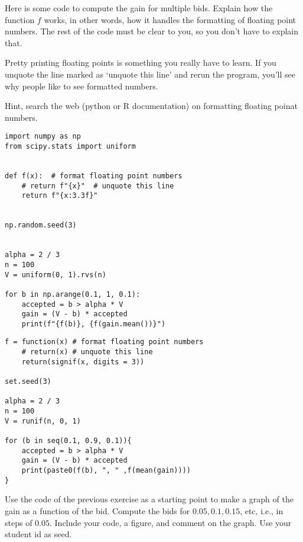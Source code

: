 \begin{exercise}
Here is some code to compute the gain for multiple bids. Explain how the function $f$ works, in other words, how it handles the  formatting of floating point numbers.
The rest of the code must be clear to you, so you don't have to explain that.

Pretty printing floating points is something you really have to learn. If you unquote the line marked as `unquote this line' and rerun the program, you'll see why people like to see formatted numbers.

Hint, search the web (python or R documentation) on formatting floating poinat numbers.
\begin{verbatim}
import numpy as np
from scipy.stats import uniform


def f(x):  # format floating point numbers
    # return f"{x}"  # unquote this line
    return f"{x:3.3f}"


np.random.seed(3)


alpha = 2 / 3
n = 100
V = uniform(0, 1).rvs(n)

for b in np.arange(0.1, 1, 0.1):
    accepted = b > alpha * V
    gain = (V - b) * accepted
    print(f"{f(b)}, {f(gain.mean())}")
\end{verbatim}

\begin{verbatim}
f = function(x) # format floating point numbers
    # return(x) # unquote this line
    return(signif(x, digits = 3))
   
set.seed(3)

alpha = 2 / 3
n = 100
V = runif(n, 0, 1)

for (b in seq(0.1, 0.9, 0.1)){
    accepted = b > alpha * V
    gain = (V - b) * accepted
    print(paste0(f(b), ", " ,f(mean(gain))))
}
\end{verbatim}
\end{exercise}


\begin{exercise}
Use the  code of the previous exercise as a starting point to make a graph of the gain as a function of the bid. Compute the bids for $0.05, 0.1, 0.15$, etc, i.e., in steps of $0.05$. Include your code,  a figure, and comment on the graph.  Use your student id as seed.
\end{exercise}


